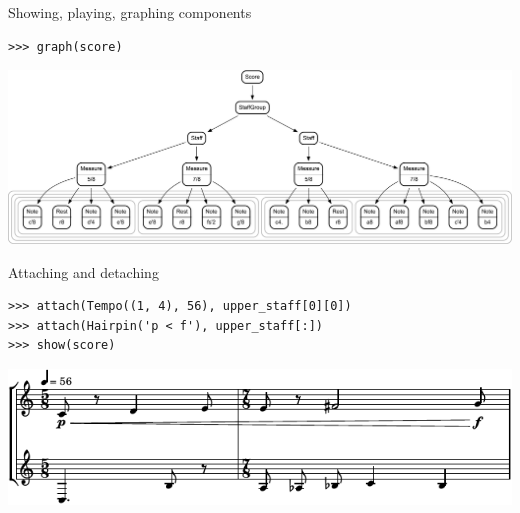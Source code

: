 \begin{frame}[fragile]{Showing, playing, graphing components}

\begin{abjadbookoutput}
\begin{singlespacing}
\vspace{-0.5\baselineskip}
\begin{verbatim}
>>> graph(score)
\end{verbatim}
\noindent\includegraphics[scale=0.4,max width=\textwidth,]{assets/graphviz-e2d5b7f2bae136a90248b612d4d7243e.pdf}
\end{singlespacing}
\end{abjadbookoutput}

\end{frame}

\begin{frame}[fragile]{Attaching and detaching}

\begin{abjadbookoutput}
\begin{singlespacing}
\vspace{-0.5\baselineskip}
\begin{verbatim}
>>> attach(Tempo((1, 4), 56), upper_staff[0][0])
>>> attach(Hairpin('p < f'), upper_staff[:])
>>> show(score)
\end{verbatim}
\noindent\includegraphics[max width=\textwidth,]{assets/lilypond-a9e19ad38171a32a9492dd585d335ca4.pdf}
\end{singlespacing}
\end{abjadbookoutput}

\end{frame}

